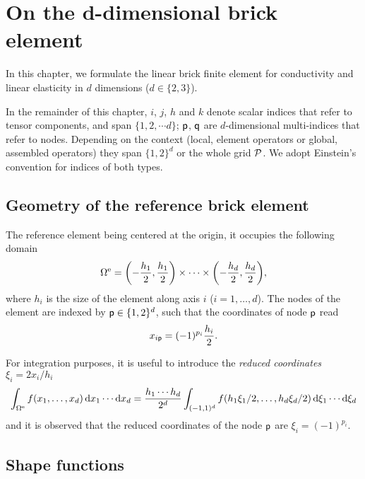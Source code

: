 \chapter{On the d-dimensional brick element}

In this chapter, we formulate the linear brick finite element for conductivity
and linear elasticity in \(d\) dimensions (\(d\in\{2, 3\}\)).

\begin{remark}
  In the remainder of this chapter, \(i\), \(j\), \(h\) and \(k\) denote scalar
  indices that refer to tensor components, and span \(\{1, 2, \cdots d\}\);
  \(\mathsf{ p}\), \(\mathsf{q}\) are \(d\)-dimensional multi-indices that refer
  to nodes. Depending on the context (local, element operators or global,
  assembled operators) they span \(\{1, 2\}^d\) or the whole grid
  \(\mathcal{P}\). We adopt Einstein's convention for indices of both types.
\end{remark}

\section{Geometry of the reference brick element}

The reference element being centered at the origin, it occupies the following
domain
\begin{equation}
  \Omega^{\mathrm{e}}=\biggl(-\frac{h_1}2, \frac{h_1}2\biggr)\times\cdots
  \times\biggl(-\frac{h_d}2, \frac{h_d}2\biggr),
\end{equation}
where \(h_i\) is the size of the element along axis \(i\) (\(i=1, \dots,
d\)). The nodes of the element are indexed by \(\mathsf{p}\in\{1, 2\}^d\), such
that the coordinates of node \(\mathsf{p}\) read
\begin{equation}
  x_{i\mathsf{p}}=(-1)^{p_i}\frac{h_i}2.
\end{equation}

For integration purposes, it is useful to introduce the \emph{reduced
  coordinates} \(\xi_i=2x_i/h_i\)
\begin{equation}
  \int_{\Omega^{\mathrm{e}}}f(x_1, \ldots, x_d)\,\mathrm d x_1\cdots\mathrm d x_d
  =\frac{h_1\cdots h_d}{2^d}\int_{(-1, 1)^d}f(h_1\xi_1/2, \ldots, h_d\xi_d/2)
  \,\mathrm d\xi_1\cdots\mathrm d\xi_d
\end{equation}
and it is observed that the reduced coordinates of the node \(\mathsf{p}\) are
\(\xi_i=(-1)^{p_i}\).

\section{Shape functions}

